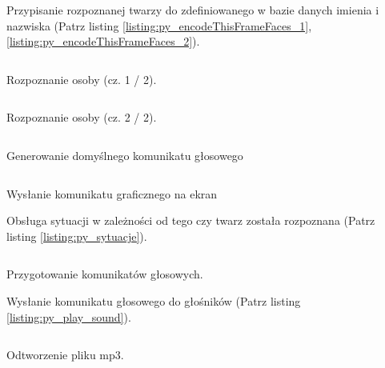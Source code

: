 \documentclass[a4paper,12pt,reqno]{article}
\begin{document}
\newpage
Przypisanie rozpoznanej twarzy do zdefiniowanego w bazie danych imienia i nazwiska (Patrz listing \ref{listing:py_encodeThisFrameFaces_1}, \ref{listing:py_encodeThisFrameFaces_2}).
\begin{listing}[H]%
\begin{mdframed}[backgroundcolor=codebg]
\inputminted{python}{code/encodeThisFrameFaces_1.py}
\end{mdframed}
\caption{Rozpoznanie osoby (cz. 1 / 2).}
\label{listing:py_encodeThisFrameFaces_1}
\end{listing}

\begin{listing}[H]%
\begin{mdframed}[backgroundcolor=codebg]
\inputminted{python}{code/encodeThisFrameFaces_2.py}
\end{mdframed}
\caption{Rozpoznanie osoby (cz. 2 / 2).}
\label{listing:py_encodeThisFrameFaces_2}
\end{listing}

\newpage
\begin{listing}[H]%
\begin{mdframed}[backgroundcolor=codebg]
\inputminted{python}{code/create_welcome_voice_for_some_person.py}
\end{mdframed}
\caption{Generowanie domyślnego komunikatu głosowego}
\label{listing:py_make_sound}
\end{listing}

\newpage
\begin{listing}[H]%
\begin{mdframed}[backgroundcolor=codebg]
\inputminted{python}{code/screenVisualization.py}
\end{mdframed}
\caption{Wysłanie komunikatu graficznego na ekran}
\label{listing:py_visual}
\end{listing}

\newpage
Obsługa sytuacji w zależności od tego czy twarz została rozpoznana  (Patrz listing\,\,\ref{listing:py_sytuacje}).
\begin{listing}[H]%
\begin{mdframed}[backgroundcolor=codebg]
\inputminted{python}{code/say_hello_what_action.py}
\end{mdframed}
\caption{Przygotowanie komunikatów głosowych.}
\label{listing:py_sytuacje}
\end{listing}

\newpage
Wysłanie komunikatu głosowego do głośników  (Patrz listing \ref{listing:py_play_sound}).
\begin{listing}[H]%
\begin{mdframed}[backgroundcolor=codebg]
\inputminted{python}{code/say_hello_play_sound.py}
\end{mdframed}
\caption{Odtworzenie pliku mp3.}
\label{listing:py_play_sound}
\end{listing}
\end{document}
